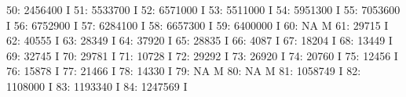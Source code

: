 \documentclass[nojss]{jss}
\begin{document}
\begin{Schunk}
\begin{Soutput}
 50:                    2456400                                          I
 51:                    5533700                                          I
 52:                    6571000                                          I
 53:                    5511000                                          I
 54:                    5951300                                          I
 55:                    7053600                                          I
 56:                    6752900                                          I
 57:                    6284100                                          I
 58:                    6657300                                          I
 59:                    6400000                                          I
 60:                         NA                                          M
 61:                      29715                                          I
 62:                      40555                                          I
 63:                      28349                                          I
 64:                      37920                                          I
 65:                      28835                                          I
 66:                       4087                                          I
 67:                      18204                                          I
 68:                      13449                                          I
 69:                      32745                                          I
 70:                      29781                                          I
 71:                      10728                                          I
 72:                      29292                                          I
 73:                      26920                                          I
 74:                      20760                                          I
 75:                      12456                                          I
 76:                      15878                                          I
 77:                      21466                                          I
 78:                      14330                                          I
 79:                         NA                                          M
 80:                         NA                                          M
 81:                    1058749                                          I
 82:                    1108000                                          I
 83:                    1193340                                          I
 84:                    1247569                                          I

\end{Soutput}
\end{Schunk}
\end{document}
